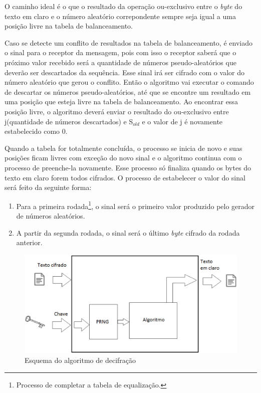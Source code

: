 O caminho ideal é o que o resultado da operação ou-exclusivo entre o \textit{byte} do texto em claro e o número aleatório correpondente sempre seja igual a uma posição livre na tabela de balanceamento.

Caso se detecte um conflito de resultados na tabela de balanceamento, é enviado o sinal para o receptor da mensagem, pois com isso o receptor saberá que o próximo valor recebido será a quantidade de números pseudo-aleatórios que deverão ser descartados da sequência. Esse sinal irá ser cifrado com o valor do número aleatório que gerou o conflito. Então o algoritmo vai executar o comando de descartar os números pseudo-aleatórios, até que se encontre um resultado em uma posição que esteja livre na tabela de balanceamento. Ao encontrar essa posição livre, o algoritmo deverá enviar o resultado do ou-exclusivo entre j(quantidade de números descartados) e S$_{old}$ e o valor de j é novamente estabelecido como 0.

Quando a tabela for totalmente concluída, o processo se inicia de novo e suas posições ficam livres com exceção do novo sinal e o algoritmo continua com o processo de preenche-la novamente. Esse processo só finaliza quando os bytes do texto em claro forem todos cifrados. O processo de estabelecer o valor do sinal será feito da seguinte forma:

\begin{enumerate}
	\item Para a primeira rodada\footnote{Processo de completar a tabela de equalização.}, o sinal será o primeiro valor produzido pelo gerador de números aleatórios.
	\item A partir da segunda rodada, o sinal será o último \textit{byte} cifrado da rodada anterior. 
\end{enumerate}

\begin{figure}[h]
	\centering
	\includegraphics[scale=0.6]{figuras/metodo_de_decifra.eps}
	\caption{Esquema do algoritmo de decifração}
\end{figure}

